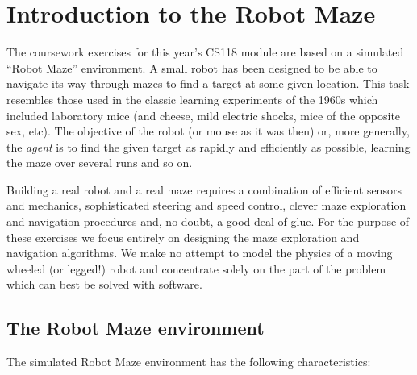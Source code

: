 \clearpage
\section{Introduction to the Robot Maze}

The coursework exercises for this year's CS118 module are based on a simulated ``Robot Maze'' environment.  A small robot has been designed to be able to navigate its way through mazes to find a target at some given location.  This task resembles those used in the classic learning 
experiments of the 1960s which included laboratory
mice (and cheese, mild electric shocks, mice of the opposite sex, etc).
The objective of the robot (or mouse as it was then) or, more generally, the \emph{agent} is to 
find the given target as rapidly and efficiently as
possible, learning the maze over several runs and so on.  

Building a real robot and a real maze requires a combination of efficient 
sensors and mechanics, sophisticated steering and speed control, clever 
maze exploration and navigation procedures and, no doubt, a good deal of
glue.  For the purpose of these exercises we focus
entirely on designing the maze exploration and navigation algorithms.
We make no attempt to model the physics of a moving wheeled (or legged!)
robot and concentrate solely on the part of the 
problem which can best be solved with software. 

\subsection{The Robot Maze environment}

The simulated Robot Maze environment has the following characteristics:

